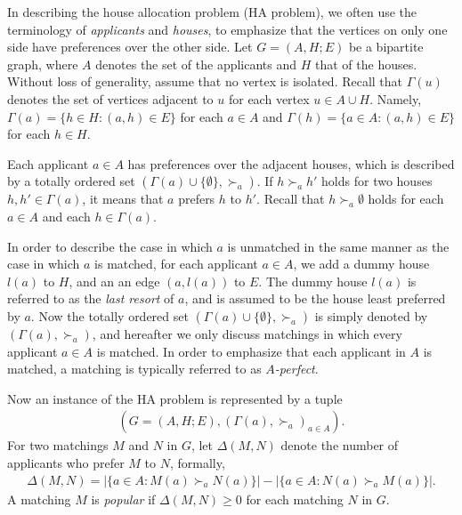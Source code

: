 \documentclass[11pt,a4paper,showkeys]{article}
\theoremstyle{plain}
\theoremstyle{definition}
\begin{document}
In describing the house allocation problem (HA problem), 
we often use the terminology of \emph{applicants} and  
\emph{houses}, 
to emphasize that the vertices on only one side have preferences over the other side. 
Let $G=(A,H;E)$ be a bipartite graph, 
where $A$ denotes the set of the applicants and 
$H$ that of the houses. 
Without loss of generality, 
assume that no vertex is isolated. 
Recall that
$\Gamma (u)$ denotes the set of vertices adjacent to $u$ 
for each vertex $u\in A \cup H$. 
Namely, 
$\Gamma (a) =\{h\in H \colon (a,h)\in E\}$ for each $a\in A$ and 
$\Gamma (h) =\{a\in A \colon (a,h)\in E\}$ for each $h\in H$. 


Each applicant $a\in A$ has preferences over the adjacent houses, 
which is described by a totally ordered set $(\Gamma (a) \cup \{\emptyset\}, \succ_a)$. 
If $h\succ_a h'$ holds for two houses $h,h' \in \Gamma(a)$, 
it means that $a$ prefers $h$ to $h'$. 
Recall that $h\succ_a \emptyset$ holds for each $a\in A$ and each $h\in \Gamma(a)$. 

In order 
to describe the case in which $a$ is unmatched  
in the same manner as the case in which $a$ is matched, 
for each applicant $a \in A$,  
we 
add a dummy house $l(a)$ to $H$, 
and an an edge $(a,l(a))$ to $E$. 
The dummy house $l(a)$ is referred to as the \emph{last resort} of $a$, 
and is assumed to be the house least preferred by $a$. 
Now the totally ordered set $(\Gamma (a) \cup \{\emptyset\}, \succ_a)$ is simply denoted by 
$(\Gamma (a), \succ_a)$, 
and hereafter we only discuss matchings in which every applicant $a\in A$ is matched. 
In order to emphasize that each applicant in $A$ is matched, 
a matching is typically referred to as \emph{$A$-perfect}. 

Now an instance of the HA problem is represented by a tuple 
\begin{align*}
    (G=(A,H;E),(\Gamma(a),\succ_a)_{a\in A}).
\end{align*}
For two matchings $M$ and $N$ in $G$, 
let $\Delta(M,N)$ denote the number of applicants who prefer $M$ to $N$, 
formally, 
\begin{align*}
\Delta (M,N) = |\{a\in A \colon M(a) \succ_a N(a)\}| - |\{a\in A \colon N(a) \succ_a M(a)\}|. 
\end{align*}
A matching $M$ is \emph{popular} if 
$\Delta(M,N) \ge 0$ for each matching $N$ in $G$. 
\end{document}
